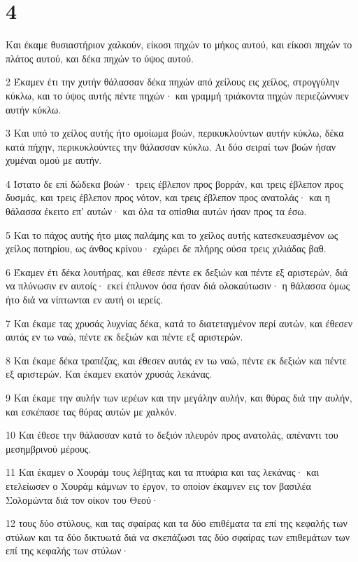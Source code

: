 \chapter{4}

\par Και έκαμε θυσιαστήριον χαλκούν, είκοσι πηχών το μήκος αυτού, και είκοσι πηχών το πλάτος αυτού, και δέκα πηχών το ύψος αυτού.
\par 2 Έκαμεν έτι την χυτήν θάλασσαν δέκα πηχών από χείλους εις χείλος, στρογγύλην κύκλω, και το ύψος αυτής πέντε πηχών· και γραμμή τριάκοντα πηχών περιεζώννυεν αυτήν κύκλω.
\par 3 Και υπό το χείλος αυτής ήτο ομοίωμα βοών, περικυκλούντων αυτήν κύκλω, δέκα κατά πήχην, περικυκλούντες την θάλασσαν κύκλω. Αι δύο σειραί των βοών ήσαν χυμέναι ομού με αυτήν.
\par 4 Ίστατο δε επί δώδεκα βοών· τρεις έβλεπον προς βορράν, και τρεις έβλεπον προς δυσμάς, και τρεις έβλεπον προς νότον, και τρεις έβλεπον προς ανατολάς· και η θάλασσα έκειτο επ' αυτών· και όλα τα οπίσθια αυτών ήσαν προς τα έσω.
\par 5 Και το πάχος αυτής ήτο μιας παλάμης και το χείλος αυτής κατεσκευασμένον ως χείλος ποτηρίου, ως άνθος κρίνου· εχώρει δε πλήρης ούσα τρεις χιλιάδας βαθ.
\par 6 Έκαμεν έτι δέκα λουτήρας, και έθεσε πέντε εκ δεξιών και πέντε εξ αριστερών, διά να πλύνωσιν εν αυτοίς· εκεί έπλυνον όσα ήσαν διά ολοκαύτωσιν· η θάλασσα όμως ήτο διά να νίπτωνται εν αυτή οι ιερείς.
\par 7 Και έκαμε τας χρυσάς λυχνίας δέκα, κατά το διατεταγμένον περί αυτών, και έθεσεν αυτάς εν τω ναώ, πέντε εκ δεξιών και πέντε εξ αριστερών.
\par 8 Και έκαμε δέκα τραπέζας, και έθεσεν αυτάς εν τω ναώ, πέντε εκ δεξιών και πέντε εξ αριστερών. Και έκαμεν εκατόν χρυσάς λεκάνας.
\par 9 Και έκαμε την αυλήν των ιερέων και την μεγάλην αυλήν, και θύρας διά την αυλήν, και εσκέπασε τας θύρας αυτών με χαλκόν.
\par 10 Και έθεσε την θάλασσαν κατά το δεξιόν πλευρόν προς ανατολάς, απέναντι του μεσημβρινού μέρους.
\par 11 Και έκαμεν ο Χουράμ τους λέβητας και τα πτυάρια και τας λεκάνας· και ετελείωσεν ο Χουράμ κάμνων το έργον, το οποίον έκαμνεν εις τον βασιλέα Σολομώντα διά τον οίκον του Θεού·
\par 12 τους δύο στύλους, και τας σφαίρας και τα δύο επιθέματα τα επί της κεφαλής των στύλων και τα δύο δικτυωτά διά να σκεπάζωσι τας δύο σφαίρας των επιθεμάτων των επί της κεφαλής των στύλων·
